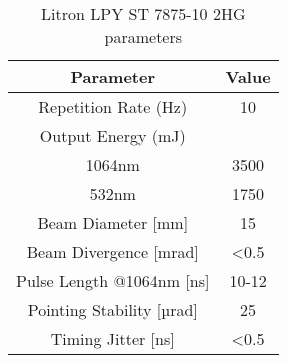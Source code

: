 \begin{table}[h!]
\centering
    \begin{threeparttable}
        \begin{tabular}{||c | c||} 
        \hline
            \textbf{Parameter} & \textbf{Value} \\ [0.5ex] 
        \hline\hline
        Repetition Rate (Hz) & 10  \\ 
        \hline
            Output Energy (mJ) & \\
            1064nm & 3500 \\
            532nm & 1750 \\
        \hline
            Beam Diameter [mm] & 15  \\
        \hline
            Beam Divergence [mrad] & <0.5 \\ 
        \hline
            Pulse Length @1064nm [ns] & 10-12 \\
        \hline
            Pointing Stability [µrad] & 25  \\
        \hline
            Timing Jitter [ns] & <0.5  \\
        \hline
        \hline
        \end{tabular}

    
        \caption{Litron LPY ST 7875-10 2HG parameters}
        \label{litronparameters}
    \end{threeparttable}
\end{table}